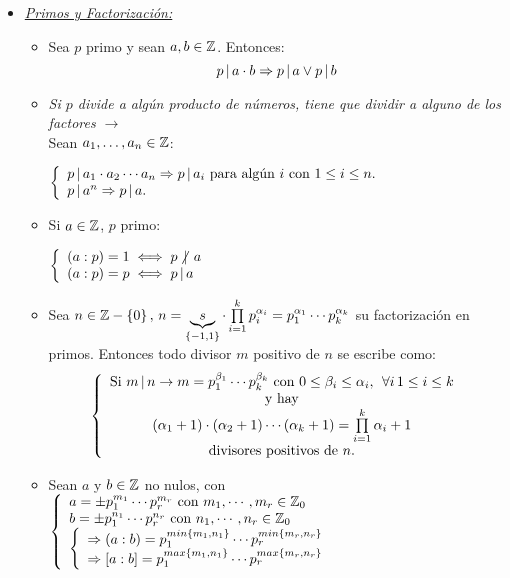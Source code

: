 \begin{itemize}
\begin{itemize}
	      \end{itemize}

	\item \textit{\underline{Primos y Factorización:}}
	      \begin{itemize}
		      \item Sea $p$ primo y sean $a,b \en \enteros$. Entonces:
		            \[
			            p \divideA a\cdot b \entonces p \divideA a \o p \divideA b
		            \]
		      \item \textit{Si $p$ divide a algún producto de números, tiene que dividir a alguno de los factores $\to$}\\
		            Sean $a_1,\dots, a_n \en \enteros$:\\
		            \begin{center}
			            $
				            \llave{l}{
					            p \divideA a_1 \cdot a_2 \cdots a_n \entonces p \divideA a_i \text{ para algún } i \text{ con } 1 \leq i \leq n.\\
					            p \divideA a^n \entonces p \divideA a.
				            }$
		            \end{center}
		      \item Si $a \en \enteros$, $p$ primo:\\
		            \begin{center}
			            $\llave{l}{
					            (a:p) = 1 \sisolosi p \noDivide a\\
					            (a:p) = p \sisolosi p \divideA a
				            }$
		            \end{center}
		      \item Sea $n \en \enteros - \set{0},\,
			            n = \ub{s }{\set{-1,1}} \cdot \productoria{i=1}{k} p_i^{\alpha_i} =
			            p_1^{\alpha_1} \cdots p_k^{\alpha_k}$
		            su factorización en primos. Entonces todo divisor $m$ positivo de $n$ se escribe como:\\
		            \[
			            \llave{c}{
			            \text{Si } m \divideA n \to  m = p_1^{\beta_1} \cdots p_k^{\beta_k}
			            \text{ con } 0 \leq \beta_i \leq \alpha_i,\, \paratodo i\, 1\leq i \leq k\\
			            \text{ y hay } \\
			            (\alpha_1 + 1) \cdot (\alpha_2 + 1)\cdots (\alpha_k + 1) = \productoria{i=1}{k} \alpha_i +1 \\
			            \text{divisores positivos de } n.
			            }\]

		      \item Sean $a$ y $b \en \enteros$ no nulos, con
		            $
			            \llave{l}{
			            a = \pm p_1^{m_1}\cdots p_r^{m_r} \text{ con } m_1,\cdots, m_r \en \enteros_0\\
			            b = \pm p_1^{n_1}\cdots p_r^{n_r} \text{ con } n_1,\cdots, n_r \en \enteros_0\\
			            \llave{l}{
			            \entonces \mcd = p_1^{min\set{m_1,n_1}}\cdots p_r^{min\set{m_r,n_r}}\\
			            \entonces [a:b] = p_1^{max\set{m_1,n_1}}\cdots p_r^{max\set{m_r,n_r}}
			            }
			            }
		            $


\end{itemize}
\end{itemize}
